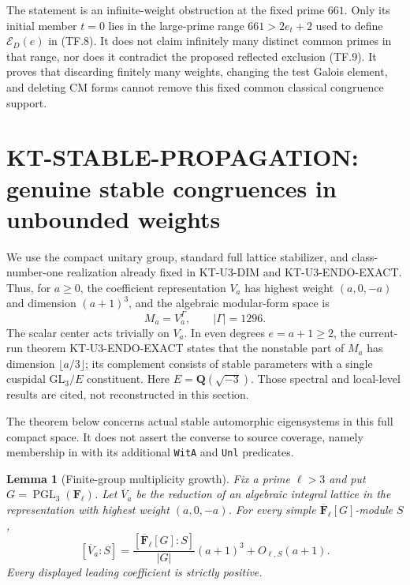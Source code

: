 \documentclass[11pt,a4paper]{article}
\newtheorem{lemma}[theorem]{Lemma}
\theoremstyle{definition}
\begin{document}
The statement is an infinite-weight obstruction at the
fixed prime $661$. Only its initial member $t=0$ lies in
the large-prime range $661>2e_t+2$ used to define
$\mathcal E_D(e)$ in (TF.8). It does not claim infinitely
many distinct common primes in that range, nor does it
contradict the proposed reflected exclusion (TF.9).
It proves that discarding finitely many weights, changing
the test Galois element, and deleting CM forms cannot
remove this fixed common classical congruence support.





\section{KT-STABLE-PROPAGATION: genuine stable congruences in unbounded weights}
\label{sec:kt-stable-propagation}

We use the compact unitary group, standard full lattice stabilizer,
and class-number-one realization already fixed in KT-U3-DIM and
KT-U3-ENDO-EXACT. Thus, for $a\geq0$, the coefficient representation
$V_a$ has highest weight $(a,0,-a)$ and dimension $(a+1)^3$, and
the algebraic modular-form space is
\[
                     M_a=V_a^{\Gamma},\qquad |\Gamma|=1296.
                                                               \tag{SP.1}
\]
The scalar center acts trivially on $V_a$. In even degrees
$e=a+1\geq2$, the current-run theorem KT-U3-ENDO-EXACT states that
the nonstable part of $M_a$ has dimension $\lfloor a/3\rfloor$;
its complement consists of stable parameters with a single
cuspidal $\mathrm{GL}_3/E$ constituent. Here
$E=\mathbf Q(\sqrt{-3})$. Those spectral and local-level results
are cited, not reconstructed in this section.

The theorem below concerns actual stable automorphic eigensystems
in this full compact space. It does not assert the converse to
source coverage, namely membership in  with its
additional \texttt{WitA} and \texttt{Unl} predicates.

\begin{lemma}[Finite-group multiplicity growth]
Fix a prime $\ell>3$ and put $G=\operatorname{PGL}_3(\mathbf F_\ell)$.
Let $\overline V_a$ be the reduction of an algebraic integral
lattice in the representation with highest weight $(a,0,-a)$.
For every simple $\overline{\mathbf F}_\ell[G]$-module $S$,
\[
 [\overline V_a:S]
   =\frac{[\overline{\mathbf F}_\ell[G]:S]}{|G|}(a+1)^3+O_{\ell,S}(a+1).
                                                               \tag{SP.2}
\]
Every displayed leading coefficient is strictly positive.
\end{lemma}
\end{document}
